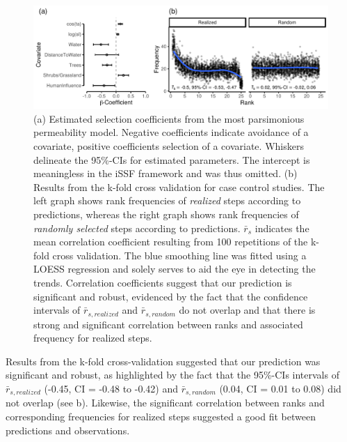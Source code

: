 \documentclass[abstract=on,10pt,a4paper,bibliography=totocnumbered]{scrartcl}
\begin{document}
\begin{figure}[h]
  \begin{center}
    \includegraphics[width = \textwidth]{99_PermeabilityResults.pdf}
    \caption{(a) Estimated selection coefficients from the most parsimonious
    permeability model. Negative coefficients indicate avoidance of a covariate,
    positive coefficients selection of a covariate. Whiskers delineate the
    95\%-CIs for estimated parameters. The intercept is meaningless in the iSSF
    framework and was thus omitted. (b) Results from the k-fold cross validation
    for case control studies. The left graph shows rank frequencies of
    \textit{realized} steps according to predictions, whereas the right graph
    shows rank frequencies of \textit{randomly selected} steps according to
    predictions. \(\bar{r}_s\) indicates the mean correlation coefficient
    resulting from 100 repetitions of the k-fold cross validation. The blue
    smoothing line was fitted using a LOESS regression and solely serves to aid
    the eye in detecting the trends. Correlation coefficients suggest that our
    prediction is significant and robust, evidenced by the fact that the
    confidence intervals of \(\bar{r}_{s, realized}\) and \(\bar{r}_{s,
    random}\) do not overlap and that there is strong and significant
    correlation between ranks and associated frequency for realized steps.}
    \label{PermeabilityResults}
  \end{center}
\end{figure}

\newpage
\noindent Results from the k-fold cross-validation suggested that our prediction
was significant and robust, as highlighted by the fact that the 95\%-CIs
intervals of \(\bar{r}_{s, realized}\) (-0.45, CI = -0.48 to -0.42) and
\(\bar{r}_{s, random}\) (0.04, CI = 0.01 to 0.08) did not overlap (see
b). Likewise, the significant correlation between
ranks and corresponding frequencies for realized steps suggested a good fit
between predictions and observations.
\end{document}
